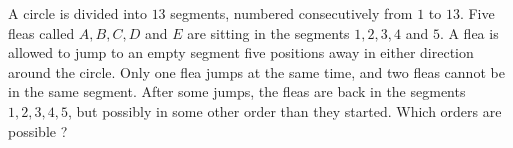 A circle is divided into $13$ segments, numbered consecutively from $1$ to $13$. Five fleas called $A,B,C,D$ and $E$ are sitting in the segments $1,2,3,4$ and $5$. A flea is allowed to jump to an empty segment five positions away in either direction around the circle. Only one flea jumps at the same time, and two fleas cannot be in the same segment. After some jumps, the fleas are back in the segments $1,2,3,4,5$,  but possibly in some other order than they started. Which orders are possible ?
